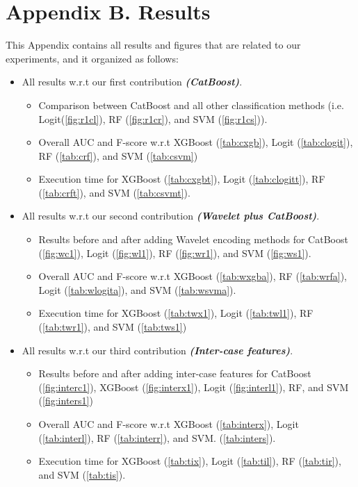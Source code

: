 \documentclass[twoside,11pt]{Latex/Classes/PhDthesisPSnPDF}
\begin{document}
	\chapter{Appendix B. Results}
This Appendix contains all results and figures that are related to our experiments, and it organized as follows:
\begin{itemize}
	\item All results w.r.t our first contribution \textbf{\textit{(CatBoost)}}.
	\begin{itemize}
		\item  Comparison between CatBoost and all other classification methods (i.e. Logit(\ref{fig:r1cl}), RF (\ref{fig:r1cr}), and SVM (\ref{fig:r1cs})).
		\item  Overall AUC and F-score w.r.t XGBoost (\ref{tab:cxgb}), Logit (\ref{tab:clogit}), RF (\ref{tab:crf}), and SVM (\ref{tab:csvm})
		\item  Execution time for XGBoost (\ref{tab:cxgbt}), Logit (\ref{tab:clogitt}), RF (\ref{tab:crft}), and SVM (\ref{tab:csvmt}).
	\end{itemize}
	\item  All results w.r.t our second contribution \textit{\textbf{(Wavelet plus CatBoost)}}.
	\begin{itemize}
		\item  Results before and after adding Wavelet encoding methods for CatBoost (\ref{fig:wc1}), Logit (\ref{fig:wl1}), RF (\ref{fig:wr1}), and SVM (\ref{fig:ws1}).	
		\item  Overall AUC and F-score w.r.t XGBoost (\ref{tab:wxgba}), RF (\ref{tab:wrfa}), Logit (\ref{tab:wlogita}), and SVM (\ref{tab:wsvma}).		
		\item  Execution time for XGBoost (\ref{tab:twx1}), Logit (\ref{tab:twl1}), RF (\ref{tab:twr1}), and SVM (\ref{tab:tws1})
	\end{itemize}

	\item  All results w.r.t our third contribution \textit{\textbf{(Inter-case features)}}.
	\begin{itemize}
		\item  Results before and after adding inter-case features for CatBoost (\ref{fig:interc1}), XGBoost (\ref{fig:interx1}), Logit (\ref{fig:interl1}), RF, and SVM	(\ref{fig:inters1})	
		\item  Overall AUC and F-score w.r.t XGBoost (\ref{tab:interx}), Logit (\ref{tab:interl}), RF (\ref{tab:interr}), and SVM. (\ref{tab:inters}).		
		\item  Execution time for XGBoost (\ref{tab:tix}), Logit (\ref{tab:til}), RF (\ref{tab:tir}), and SVM (\ref{tab:tis}).
	\end{itemize}
	\end{itemize}
\end{document}
